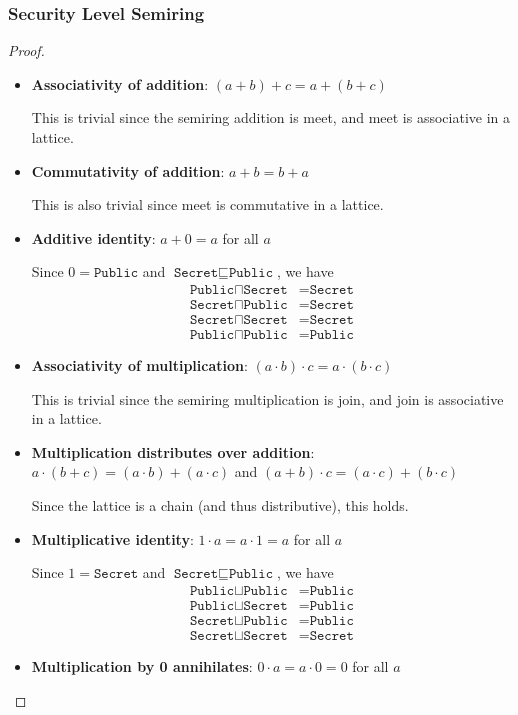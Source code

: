 \documentclass[conference]{IEEEtran}
\newcommand\public{\texttt{Public}}
\newcommand\secret{\texttt{Secret}}
\begin{document}
\subsubsection{Security Level Semiring}
\label{app-b}
\begin{proof}\leavevmode
	\begin{itemize}
		\item \textbf{Associativity of addition}: $(a+b)+c=a+(b+c)$
		
		This is trivial since the semiring addition is meet, and meet is associative in a lattice.
		\item \textbf{Commutativity of addition}: $a+b=b+a$
		
		This is also trivial since meet is commutative in a lattice.
		\item \textbf{Additive identity}: $a+0=a$ for all $a$
		
		Since $0=\public$ and $\secret\sqsubseteq\public$, we have
		\begin{equation}
			\begin{aligned}
				\public\sqcap\secret&=\secret\\
				\secret\sqcap\public&=\secret\\
				\secret\sqcap\secret&=\secret\\
				\public\sqcap\public&=\public				
			\end{aligned}
		\end{equation}
		\item \textbf{Associativity of multiplication}: $(a\cdot b)\cdot c=a\cdot (b\cdot c)$
		
		This is trivial since the semiring multiplication is join, and join is associative in a lattice.
		
		\item \textbf{Multiplication distributes over addition}: $a\cdot(b+c)=(a\cdot b)+(a\cdot c)$ and $(a+b)\cdot c=(a\cdot c)+(b\cdot c)$
		
		Since the lattice is a chain (and thus distributive), this holds.
		\item \textbf{Multiplicative identity}: $1\cdot a=a\cdot 1=a$ for all $a$
		
		Since $1=\secret$ and $\secret\sqsubseteq\public$, we have
		\begin{equation}
			\begin{aligned}
				\public\sqcup\public&=\public\\
				\public\sqcup\secret&=\public\\
				\secret\sqcup\public&=\public\\
				\secret\sqcup\secret&=\secret
			\end{aligned}
		\end{equation}
		\item \textbf{Multiplication by 0 annihilates}: $0\cdot a=a\cdot 0=0$ for all $a$
		

\end{itemize}
\end{proof}
\end{document}
